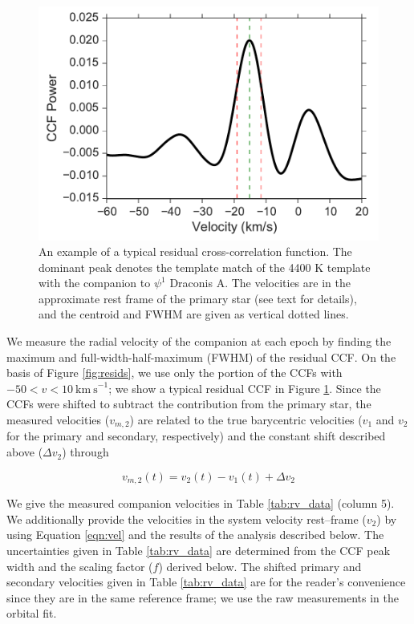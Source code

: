\begin{figure}
  \centering
  \includegraphics[width=\columnwidth]{Figures/paper4_Typical_CCF.pdf}
  \caption{An example of a typical residual cross-correlation function. The dominant peak denotes the template match of the 4400 K template with the companion to $\psi^1$ Draconis A. The velocities are in the approximate rest frame of the primary star (see text for details), and the centroid and FWHM are given as vertical dotted lines.}
  \label{fig:ccf_typical}
\end{figure}




We measure the radial velocity of the companion at each epoch by finding the maximum and full-width-half-maximum (FWHM) of the residual CCF. On the basis of Figure \ref{fig:resids}, we use only the portion of the CCFs with $-50 < v < 10\ \mathrm{km\ s}^{-1}$; we show a typical residual CCF in Figure \ref{fig:ccf_typical}. Since the CCFs were shifted to subtract the contribution from the primary star, the measured velocities ($v_{m, 2}$) are related to the true barycentric velocities ($v_1$ and $v_2$ for the primary and secondary, respectively) and the constant shift described above ($\Delta v_2$) through

\begin{equation}
v_{m, 2}(t) = v_2(t) - v_1(t) + \Delta v_2
\label{eqn:vel}
\end{equation}

We give the measured companion velocities in Table \ref{tab:rv_data} (column 5). We additionally provide the velocities in the system velocity rest--frame ($v_2$) by using Equation \ref{eqn:vel} and the results of the analysis described below. The uncertainties given in Table \ref{tab:rv_data} are determined from the CCF peak width and the scaling factor ($f$) derived below. The shifted primary and secondary velocities given in Table \ref{tab:rv_data} are for the reader's convenience since they are in the same reference frame; we use the raw measurements in the orbital fit.


